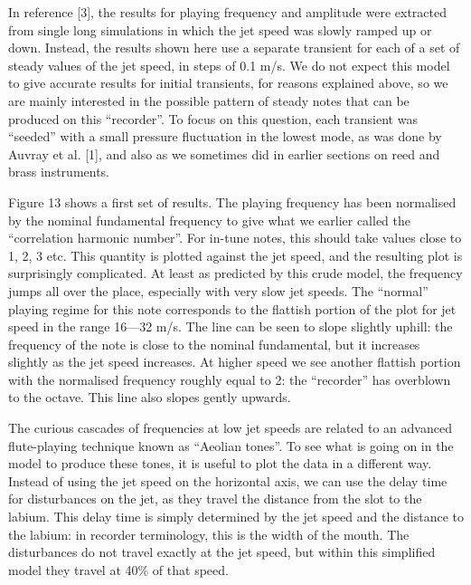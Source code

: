   In reference [3], the results for playing frequency and amplitude were 
  extracted from single long simulations in which the jet speed was slowly 
  ramped up or down. Instead, the results shown here use a separate transient 
  for each of a set of steady values of the jet speed, in steps of 0.1 m/s. We 
  do not expect this model to give accurate results for initial transients, for 
  reasons explained above, so we are mainly interested in the possible pattern 
  of steady notes that can be produced on this ``recorder''. To focus on this 
  question, each transient was “seeded” with a small pressure fluctuation in 
  the lowest mode, as was done by Auvray et al. [1], and also as we sometimes 
  did in earlier sections on reed and brass instruments. 

  Figure 13 shows a first set of results. The playing frequency has been 
  normalised by the nominal fundamental frequency to give what we earlier 
  called the “correlation harmonic number”. For in-tune notes, this should take 
  values close to 1, 2, 3 etc. This quantity is plotted against the jet speed, 
  and the resulting plot is surprisingly complicated. At least as predicted by 
  this crude model, the frequency jumps all over the place, especially with 
  very slow jet speeds. The “normal” playing regime for this note corresponds 
  to the flattish portion of the plot for jet speed in the range 16—32 m/s. The 
  line can be seen to slope slightly uphill: the frequency of the note is close 
  to the nominal fundamental, but it increases slightly as the jet speed 
  increases. At higher speed we see another flattish portion with the 
  normalised frequency roughly equal to 2: the “recorder” has overblown to the 
  octave. This line also slopes gently upwards. 


  The curious cascades of frequencies at low jet speeds are related to an 
  advanced flute-playing technique known as “Aeolian tones”. To see what is 
  going on in the model to produce these tones, it is useful to plot the data 
  in a different way. Instead of using the jet speed on the horizontal axis, we 
  can use the delay time for disturbances on the jet, as they travel the 
  distance from the slot to the labium. This delay time is simply determined by 
  the jet speed and the distance to the labium: in recorder terminology, this 
  is the width of the mouth. The disturbances do not travel exactly at the jet 
  speed, but within this simplified model they travel at 40\% of that speed. 


